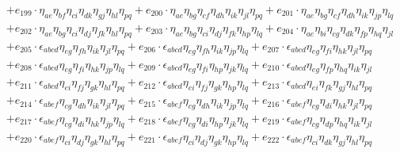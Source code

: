 \begin{itemize}
\begin{align}
    & + e_{199} \cdot \eta_{a e} \eta_{b f} \eta_{c i} \eta_{d k} \eta_{g j} \eta_{h l} \eta_{p q} + e_{200} \cdot \eta_{a e} \eta_{b g} \eta_{c f} \eta_{d h} \eta_{i k} \eta_{j l} \eta_{p q} + e_{201} \cdot \eta_{a e} \eta_{b g} \eta_{c f} \eta_{d h} \eta_{i k} \eta_{j p} \eta_{l q} \nonumber \\
    & + e_{202} \cdot \eta_{a e} \eta_{b g} \eta_{c i} \eta_{d j} \eta_{f k} \eta_{h l} \eta_{p q} + e_{203} \cdot \eta_{a e} \eta_{b g} \eta_{c i} \eta_{d j} \eta_{f k} \eta_{h p} \eta_{l q} + e_{204} \cdot \eta_{a e} \eta_{b i} \eta_{c g} \eta_{d k} \eta_{f p} \eta_{h q} \eta_{j l} \nonumber \\
    & + e_{205} \cdot \epsilon_{a b c d} \eta_{e g} \eta_{f h} \eta_{i k} \eta_{j l} \eta_{p q} + e_{206} \cdot \epsilon_{a b c d} \eta_{e g} \eta_{f h} \eta_{i k} \eta_{j p} \eta_{l q} + e_{207} \cdot \epsilon_{a b c d} \eta_{e g} \eta_{f i} \eta_{h k} \eta_{j l} \eta_{p q} \nonumber \\
    & + e_{208} \cdot \epsilon_{a b c d} \eta_{e g} \eta_{f i} \eta_{h k} \eta_{j p} \eta_{l q} + e_{209} \cdot \epsilon_{a b c d} \eta_{e g} \eta_{f i} \eta_{h p} \eta_{j k} \eta_{l q} + e_{210} \cdot \epsilon_{a b c d} \eta_{e g} \eta_{f p} \eta_{h q} \eta_{i k} \eta_{j l} \nonumber \\
    & + e_{211} \cdot \epsilon_{a b c d} \eta_{e i} \eta_{f j} \eta_{g k} \eta_{h l} \eta_{p q} + e_{212} \cdot \epsilon_{a b c d} \eta_{e i} \eta_{f j} \eta_{g k} \eta_{h p} \eta_{l q} + e_{213} \cdot \epsilon_{a b c d} \eta_{e i} \eta_{f k} \eta_{g j} \eta_{h l} \eta_{p q} \nonumber \\
    & + e_{214} \cdot \epsilon_{a b e f} \eta_{c g} \eta_{d h} \eta_{i k} \eta_{j l} \eta_{p q} + e_{215} \cdot \epsilon_{a b e f} \eta_{c g} \eta_{d h} \eta_{i k} \eta_{j p} \eta_{l q} + e_{216} \cdot \epsilon_{a b e f} \eta_{c g} \eta_{d i} \eta_{h k} \eta_{j l} \eta_{p q} \nonumber \\
    & + e_{217} \cdot \epsilon_{a b e f} \eta_{c g} \eta_{d i} \eta_{h k} \eta_{j p} \eta_{l q} + e_{218} \cdot \epsilon_{a b e f} \eta_{c g} \eta_{d i} \eta_{h p} \eta_{j k} \eta_{l q} + e_{219} \cdot \epsilon_{a b e f} \eta_{c g} \eta_{d p} \eta_{h q} \eta_{i k} \eta_{j l} \nonumber \\
    & + e_{220} \cdot \epsilon_{a b e f} \eta_{c i} \eta_{d j} \eta_{g k} \eta_{h l} \eta_{p q} + e_{221} \cdot \epsilon_{a b e f} \eta_{c i} \eta_{d j} \eta_{g k} \eta_{h p} \eta_{l q} + e_{222} \cdot \epsilon_{a b e f} \eta_{c i} \eta_{d k} \eta_{g j} \eta_{h l} \eta_{p q} \nonumber \\

\end{align}
\end{itemize}
